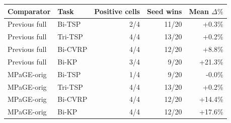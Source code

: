 \begin{tabular}{llrrr}
\toprule
Comparator & Task & Positive cells & Seed wins & Mean $\Delta\%$ \\
\midrule
Previous full & Bi-TSP & 2/4 & 11/20 & +0.3\% \\
Previous full & Tri-TSP & 4/4 & 13/20 & +0.2\% \\
Previous full & Bi-CVRP & 4/4 & 12/20 & +8.8\% \\
Previous full & Bi-KP & 3/4 & 9/20 & +21.3\% \\
MPaGE-orig & Bi-TSP & 1/4 & 9/20 & -0.0\% \\
MPaGE-orig & Tri-TSP & 4/4 & 13/20 & +0.2\% \\
MPaGE-orig & Bi-CVRP & 4/4 & 12/20 & +14.4\% \\
MPaGE-orig & Bi-KP & 4/4 & 12/20 & +17.6\% \\
\bottomrule
\end{tabular}
